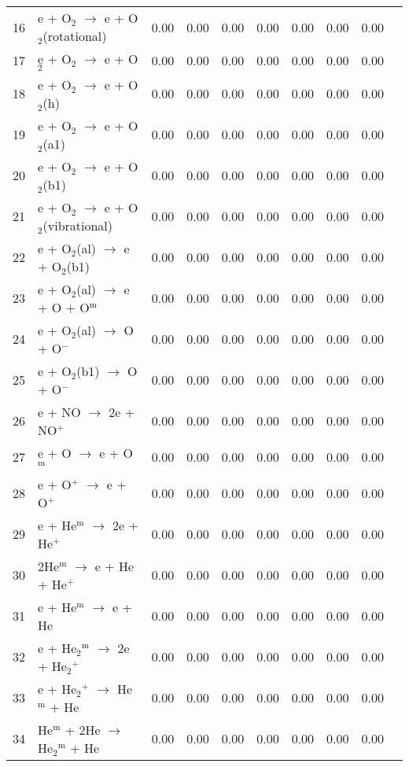 \documentclass{article}
\begin{document}
\begin{table}[H]
{\begin{tabu}{clcccccccc}
      16 & e + O$_{2}$ $\rightarrow$ e + O$_{2}$(rotational) & 0.00 & 0.00 & 0.00 & 0.00 & 0.00 & 0.00 & 0.00 &  \\
      17 & e + O$_{2}$ $\rightarrow$ e + O$_{2}$ & 0.00 & 0.00 & 0.00 & 0.00 & 0.00 & 0.00 & 0.00 &  \\
      18 & e + O$_{2}$ $\rightarrow$ e + O$_{2}$(h) & 0.00 & 0.00 & 0.00 & 0.00 & 0.00 & 0.00 & 0.00 &  \\
      19 & e + O$_{2}$ $\rightarrow$ e + O$_{2}$(a1) & 0.00 & 0.00 & 0.00 & 0.00 & 0.00 & 0.00 & 0.00 &  \\
      20 & e + O$_{2}$ $\rightarrow$ e + O$_{2}$(b1) & 0.00 & 0.00 & 0.00 & 0.00 & 0.00 & 0.00 & 0.00 &  \\
      21 & e + O$_{2}$ $\rightarrow$ e + O$_{2}$(vibrational) & 0.00 & 0.00 & 0.00 & 0.00 & 0.00 & 0.00 & 0.00 &  \\
      22 & e + O$_{2}$(al) $\rightarrow$ e + O$_{2}$(b1) & 0.00 & 0.00 & 0.00 & 0.00 & 0.00 & 0.00 & 0.00 &  \\
      23 & e + O$_{2}$(al) $\rightarrow$ e + O + O$^\text{m}$ & 0.00 & 0.00 & 0.00 & 0.00 & 0.00 & 0.00 & 0.00 &  \\
      24 & e + O$_{2}$(al) $\rightarrow$ O + O$^{-}$ & 0.00 & 0.00 & 0.00 & 0.00 & 0.00 & 0.00 & 0.00 &  \\
      25 & e + O$_{2}$(b1) $\rightarrow$ O + O$^{-}$ & 0.00 & 0.00 & 0.00 & 0.00 & 0.00 & 0.00 & 0.00 &  \\
      26 & e + NO $\rightarrow$ 2e + NO$^{+}$ & 0.00 & 0.00 & 0.00 & 0.00 & 0.00 & 0.00 & 0.00 &  \\
      27 & e + O $\rightarrow$ e + O$^\text{m}$ & 0.00 & 0.00 & 0.00 & 0.00 & 0.00 & 0.00 & 0.00 &  \\
      28 & e + O$^{+}$ $\rightarrow$ e + O$^{+}$ & 0.00 & 0.00 & 0.00 & 0.00 & 0.00 & 0.00 & 0.00 &  \\
      29 & e + He$^\text{m}$ $\rightarrow$ 2e + He$^{+}$ & 0.00 & 0.00 & 0.00 & 0.00 & 0.00 & 0.00 & 0.00 &  \\
      30 & 2He$^\text{m}$ $\rightarrow$ e + He + He$^{+}$ & 0.00 & 0.00 & 0.00 & 0.00 & 0.00 & 0.00 & 0.00 &  \\
      31 & e + He$^\text{m}$ $\rightarrow$ e + He & 0.00 & 0.00 & 0.00 & 0.00 & 0.00 & 0.00 & 0.00 &  \\
      32 & e + He$_2$$^\text{m}$ $\rightarrow$ 2e + He$_{2}$$^{+}$ & 0.00 & 0.00 & 0.00 & 0.00 & 0.00 & 0.00 & 0.00 &  \\
      33 & e + He$_{2}$$^{+}$ $\rightarrow$ He$^\text{m}$ + He & 0.00 & 0.00 & 0.00 & 0.00 & 0.00 & 0.00 & 0.00 &  \\
      34 & He$^\text{m}$ + 2He $\rightarrow$ He$_2$$^\text{m}$ + He & 0.00 & 0.00 & 0.00 & 0.00 & 0.00 & 0.00 & 0.00 &  \\
    \end{tabu}
  }
\end{table}
\end{document}
